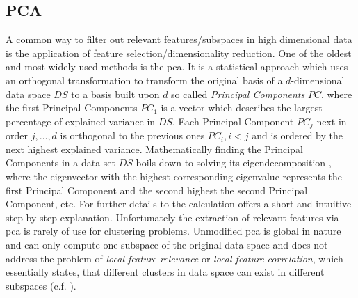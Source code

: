 \subsection{PCA}
A common way to filter out relevant features/subspaces in high dimensional data is the application of feature selection/dimensionality reduction. One of the oldest and most widely used methods is the \gls{pca}. It is a statistical approach which uses an orthogonal transformation to transform the original basis of a $d$-dimensional data space $DS$ to a basis built upon $d$ so called \textit{Principal Components} $PC$, where the first Principal Components $PC_1$ is a vector which describes the largest percentage of explained variance in $DS$. Each Principal Component $PC_j$ next in order $j,\dotsc,d$ is orthogonal to the previous ones $PC_i, i<j$ and is ordered by the next highest explained variance. Mathematically finding the Principal Components in a data set $DS$ boils down to solving its eigendecomposition , where the eigenvector with the highest corresponding eigenvalue represents the first Principal Component and the second highest the second Principal Component, etc\cite{pcawold1987principal}. For further details to the calculation \textcite{pcamljolliffe1986principal} offers a short and intuitive step-by-step explanation.
Unfortunately the extraction of relevant features via \gls{pca} is rarely of use for clustering problems. Unmodified \gls{pca} is global in nature and can only compute one subspace of the original data space and does not address the problem of \textit{local feature relevance} or \textit{local feature correlation}, which essentially states, that different clusters in data space can exist in different subspaces\cite{kriegel2009clustering} (c.f. \cite{PCAshlens2014tutorial}). 

